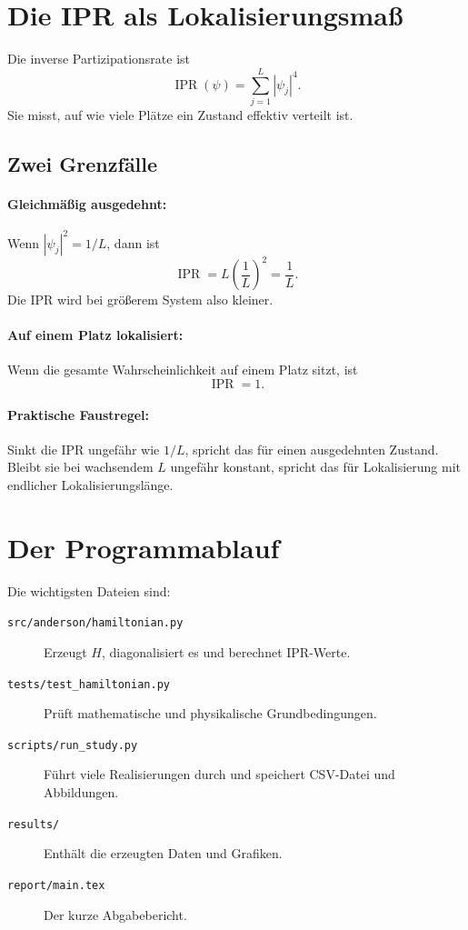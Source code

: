 \documentclass[11pt,a4paper]{article}
\begin{document}
\section{Die IPR als Lokalisierungsmaß}
Die inverse Partizipationsrate ist
\[
 \operatorname{IPR}(\psi)=\sum_{j=1}^{L}|\psi_j|^4.
\]
Sie misst, auf wie viele Plätze ein Zustand effektiv verteilt ist.

\subsection{Zwei Grenzfälle}
\paragraph{Gleichmäßig ausgedehnt:}
Wenn $|\psi_j|^2=1/L$, dann ist
\[
 \operatorname{IPR}=L\left(\frac{1}{L}\right)^2=\frac{1}{L}.
\]
Die IPR wird bei größerem System also kleiner.

\paragraph{Auf einem Platz lokalisiert:}
Wenn die gesamte Wahrscheinlichkeit auf einem Platz sitzt, ist
\[
 \operatorname{IPR}=1.
\]

\paragraph{Praktische Faustregel:}
Sinkt die IPR ungefähr wie $1/L$, spricht das für einen ausgedehnten
Zustand. Bleibt sie bei wachsendem $L$ ungefähr konstant, spricht das für
Lokalisierung mit endlicher Lokalisierungslänge.

\section{Der Programmablauf}
Die wichtigsten Dateien sind:
\begin{description}
 \item[\texttt{src/anderson/hamiltonian.py}] Erzeugt $H$, diagonalisiert es
 und berechnet IPR-Werte.
 \item[\texttt{tests/test\_hamiltonian.py}] Prüft mathematische und
 physikalische Grundbedingungen.
 \item[\texttt{scripts/run\_study.py}] Führt viele Realisierungen durch und
 speichert CSV-Datei und Abbildungen.
 \item[\texttt{results/}] Enthält die erzeugten Daten und Grafiken.
 \item[\texttt{report/main.tex}] Der kurze Abgabebericht.
\end{description}
\end{document}
